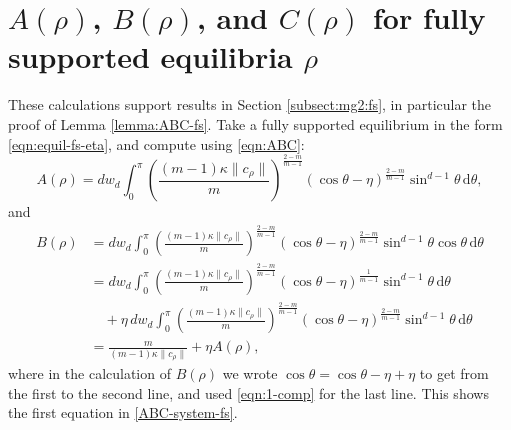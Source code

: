 \documentclass[11pt]{amsart}
\newcommand{\bbs}{\mathbb S}
\def\d{\mathrm{d}}
\newcommand{\dx}{\mathrm{d}S (x)}
\newcommand{\dm}{d} %
\begin{document}

\appendix
\section{$A(\rho)$, $B(\rho)$, and $C(\rho)$ for fully supported equilibria $\rho$}\label{appendix:fs}

These calculations support results in Section \ref{subsect:mg2:fs}, in particular the proof of Lemma \ref{lemma:ABC-fs}. Take a fully supported equilibrium in the form \eqref{eqn:equil-fs-eta}, and compute using \eqref{eqn:ABC}:
\begin{equation}
\label{eqn:A-fs-calc1}
A(\rho)
=\dm w_\dm\int_0^\pi\left(\frac{(m-1)\kappa \|c_\rho\|}{m}\right)^{\frac{2-m}{m-1}}\left(\cos\theta-\eta\right)^{\frac{2-m}{m-1}}\sin^{\dm-1}\theta \, \d\theta,
\end{equation}
and
\begin{equation}
\label{eqn:B-fs-calc1}
\begin{aligned}
B(\rho)
&=\dm w_\dm\int_0^\pi\left(\frac{(m-1)\kappa \|c_\rho\|}{m}\right)^{\frac{2-m}{m-1}}\left(\cos\theta-\eta\right)^{\frac{2-m}{m-1}}\sin^{\dm-1}\theta \cos\theta \, \d\theta\\
&=\dm w_\dm\int_0^\pi\left(\frac{(m-1)\kappa \|c_\rho\|}{m}\right)^{\frac{2-m}{m-1}}\left(\cos\theta-\eta\right)^{\frac{1}{m-1}}\sin^{\dm-1}\theta \, \d\theta\\
&\quad +\eta \, \dm w_\dm\int_0^\pi\left(\frac{(m-1)\kappa \|c_\rho\|}{m}\right)^{\frac{2-m}{m-1}}\left(\cos\theta-\eta\right)^{\frac{2-m}{m-1}}\sin^{\dm-1}\theta \,\d\theta\\
&=\frac{m}{(m-1)\kappa \|c_\rho\|} + \eta A(\rho),
\end{aligned}
\end{equation}
where in the calculation of $B(\rho)$ we wrote $\cos \theta = \cos \theta - \eta + \eta$ to get from the first to the second line, and used \eqref{eqn:1-comp} for the last line. This shows the first equation in \eqref{ABC-system-fs}.
\end{document}
